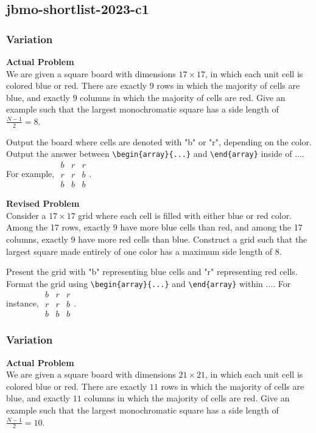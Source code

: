 \subsection{jbmo-shortlist-2023-c1}
\subsubsection{Variation}
\textbf{Actual Problem}\\
We are given a square board with dimensions $17\times 17$, in which each unit cell is colored blue or red. There are exactly $9$ rows in which the majority of cells are blue, and exactly $9$ columns in which the majority of cells are red.  Give an example such that the largest monochromatic square has a side length of $\frac{N-1}{2}=8$.

Output the board where cells are denoted with "b" or "r", depending on the color. Output the answer between \verb|\begin{array}{...}| and \verb|\end{array}| inside of $\boxed{...}$. For example, $\boxed{\begin{array}{ccc}b & r & r \\ r & r & b \\ b & b & b\end{array}}$.

\textbf{Revised Problem}\\
Consider a $17 \times 17$ grid where each cell is filled with either blue or red color. Among the 17 rows, exactly 9 have more blue cells than red, and among the 17 columns, exactly 9 have more red cells than blue. Construct a grid such that the largest square made entirely of one color has a maximum side length of 8.

Present the grid with "b" representing blue cells and "r" representing red cells. Format the grid using \verb|\begin{array}{...}| and \verb|\end{array}| within $\boxed{...}$. For instance, $\boxed{\begin{array}{ccc}b & r & r \\ r & r & b \\ b & b & b\end{array}}$.

\subsubsection{Variation}
\textbf{Actual Problem}\\
We are given a square board with dimensions $21\times 21$, in which each unit cell is colored blue or red. There are exactly $11$ rows in which the majority of cells are blue, and exactly $11$ columns in which the majority of cells are red.  Give an example such that the largest monochromatic square has a side length of $\frac{N-1}{2}=10$.

